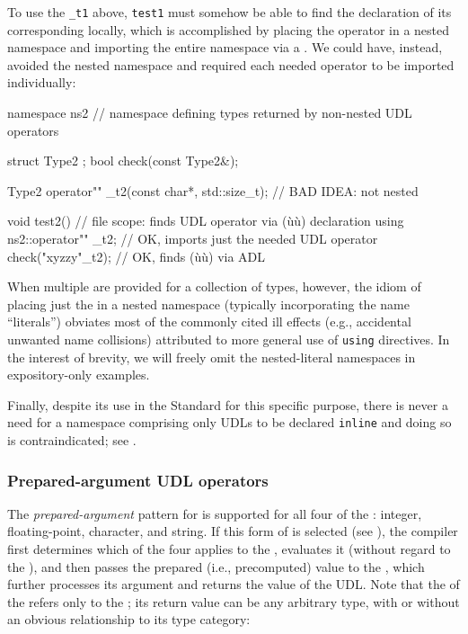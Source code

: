 \noindent To use the \lstinline!_t1!  above, \lstinline!test1! must
somehow be able to find the declaration of its corresponding  locally, which is accomplished by placing the operator in a
nested namespace and importing the entire namespace via a . We could have, instead, avoided the nested namespace and
required each needed operator to be imported individually:

\begin{emcppslisting}
namespace ns2  // namespace defining types returned by non-nested UDL operators
{
    struct Type2 { };
    bool check(const Type2&);

    Type2 operator"" _t2(const char*, std::size_t);  // BAD IDEA: not nested
}

void test2()  // file scope: finds UDL operator via (ù{}ù) declaration
{
    using ns2::operator"" _t2;  // OK, imports just the needed UDL operator
    check("xyzzy"_t2);          // OK, finds (ù{}ù) via ADL
}
\end{emcppslisting}
    
\noindent When multiple  are provided for a collection of
types, however, the idiom of placing just the  in
a nested namespace (typically incorporating the name ``literals'')
obviates most of the commonly cited ill effects (e.g., accidental
unwanted name collisions) attributed to more general use of
\lstinline!using! directives. In the interest of brevity, we will freely
omit the nested-literal namespaces in expository-only examples.

Finally, despite its use in the Standard for this specific purpose,
there is never a need for a namespace comprising only UDLs to be
declared \lstinline!inline! and doing so is contraindicated; see .

\subsubsection[Prepared-argument UDL operators]{Prepared-argument UDL operators}\label{prepared-argument-udl-operators}

The \emph{prepared-argument} pattern for  is
supported for all four of the : integer,
floating-point, character, and string. If this form of  is selected (see ), the compiler
first determines which of the four  applies
to the , evaluates it (without regard to the
), and then passes the prepared (i.e., precomputed)
value to the , which further processes its argument
and returns the value of the UDL. Note that the  of the  refers only to the ; its return value can be any arbitrary type, with or without an
obvious relationship to its type category:

